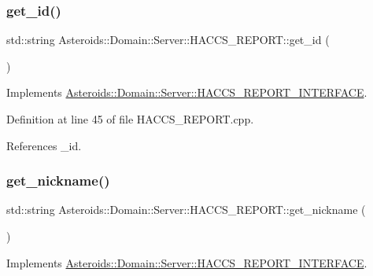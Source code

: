 \subsubsection{\texorpdfstring{get\+\_\+id()}{get\_id()}}
{\footnotesize\ttfamily std\+::string Asteroids\+::\+Domain\+::\+Server\+::\+H\+A\+C\+C\+S\+\_\+\+R\+E\+P\+O\+R\+T\+::get\+\_\+id (\begin{DoxyParamCaption}{ }\end{DoxyParamCaption})\hspace{0.3cm}{\ttfamily [virtual]}}



Implements \hyperlink{classAsteroids_1_1Domain_1_1Server_1_1HACCS__REPORT__INTERFACE_a7d7aa92456e0a24475b8618d066ffd63}{Asteroids\+::\+Domain\+::\+Server\+::\+H\+A\+C\+C\+S\+\_\+\+R\+E\+P\+O\+R\+T\+\_\+\+I\+N\+T\+E\+R\+F\+A\+CE}.



Definition at line 45 of file H\+A\+C\+C\+S\+\_\+\+R\+E\+P\+O\+R\+T.\+cpp.



References \+\_\+id.

\mbox{\label{classAsteroids_1_1Domain_1_1Server_1_1HACCS__REPORT_a9e38472572d93ccb521931abf8fe4003}} 
\subsubsection{\texorpdfstring{get\+\_\+nickname()}{get\_nickname()}}
{\footnotesize\ttfamily std\+::string Asteroids\+::\+Domain\+::\+Server\+::\+H\+A\+C\+C\+S\+\_\+\+R\+E\+P\+O\+R\+T\+::get\+\_\+nickname (\begin{DoxyParamCaption}{ }\end{DoxyParamCaption})\hspace{0.3cm}{\ttfamily [virtual]}}



Implements \hyperlink{classAsteroids_1_1Domain_1_1Server_1_1HACCS__REPORT__INTERFACE_a75c843246909be0ab1f8ecd7ac4fd3e8}{Asteroids\+::\+Domain\+::\+Server\+::\+H\+A\+C\+C\+S\+\_\+\+R\+E\+P\+O\+R\+T\+\_\+\+I\+N\+T\+E\+R\+F\+A\+CE}.



